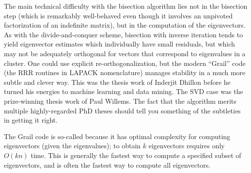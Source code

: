 \documentclass[12pt, leqno]{article} %
\begin{document}
The main technical difficulty with the bisection algorithm lies not
in the bisection step (which is remarkably well-behaved even though
it involves an unpivoted factorization of an indefinite matrix),
but in the computation of the eigenvectors.  As with the divide-and-conquer
scheme, bisection with inverse iteration tends to yield eigenvector
estimates which individually have small residuals, but which may not be
adequately orthogonal for vectors that correspond to eigenvalues in a
cluster.  One could use explicit re-orthogonalization, but the modern
``Grail'' code (the RRR routines in LAPACK nomenclature) manages
stability in a much more subtle and clever way.
This was the thesis work of Inderjit Dhillon before he turned his
energies to machine learning and data mining.  The SVD
case was the prize-winning thesis work of Paul Willems.  The fact that
the algorithm merits multiple highly-regarded PhD theses should tell
you something of the subtleties in getting it right.

The Grail code is so-called because it has optimal complexity for
computing eigenvectors (given the eigenvalues); to obtain $k$ eigenvectors
requires only $O(kn)$ time.  This is generally the fastest way to
compute a specified subset of eigenvectors, and is often the fastest
way to compute all eigenvectors.
\end{document}
